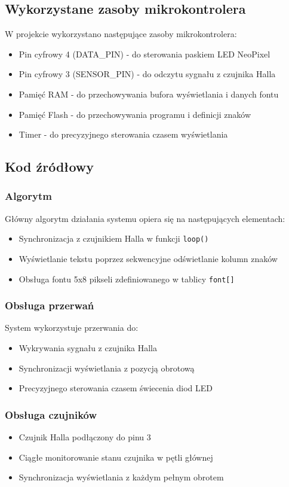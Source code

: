 \documentclass{article}
\begin{document}
\subsection{Wykorzystane zasoby mikrokontrolera}
W projekcie wykorzystano następujące zasoby mikrokontrolera:
\begin{itemize}
    \item Pin cyfrowy 4 (DATA\_PIN) - do sterowania paskiem LED NeoPixel
    \item Pin cyfrowy 3 (SENSOR\_PIN) - do odczytu sygnału z czujnika Halla
    \item Pamięć RAM - do przechowywania bufora wyświetlania i danych fontu
    \item Pamięć Flash - do przechowywania programu i definicji znaków
    \item Timer - do precyzyjnego sterowania czasem wyświetlania
\end{itemize}

\subsection{Kod źródłowy}
\subsubsection{Algorytm}
Główny algorytm działania systemu opiera się na następujących elementach:
\begin{itemize}
    \item Synchronizacja z czujnikiem Halla w funkcji \texttt{loop()}
    \item Wyświetlanie tekstu poprzez sekwencyjne odświetlanie kolumn znaków
    \item Obsługa fontu 5x8 pikseli zdefiniowanego w tablicy \texttt{font[]}
\end{itemize}

\subsubsection{Obsługa przerwań}
System wykorzystuje przerwania do:
\begin{itemize}
    \item Wykrywania sygnału z czujnika Halla
    \item Synchronizacji wyświetlania z pozycją obrotową
    \item Precyzyjnego sterowania czasem świecenia diod LED
\end{itemize}

\subsubsection{Obsługa czujników}
\begin{itemize}
    \item Czujnik Halla podłączony do pinu 3
    \item Ciągłe monitorowanie stanu czujnika w pętli głównej
    \item Synchronizacja wyświetlania z każdym pełnym obrotem
\end{itemize}
\end{document}

